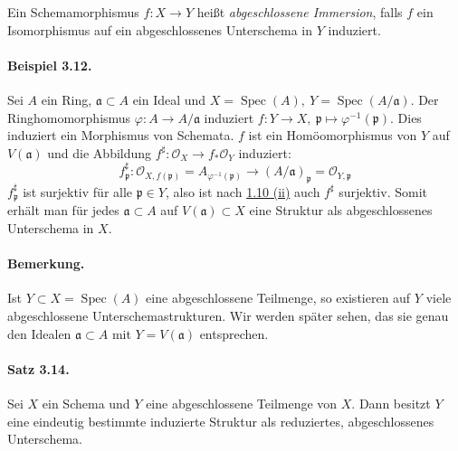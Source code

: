 \documentclass[11pt,b5paper,openany]{memoir}
\begin{document}
Ein Schemamorphismus $f:X\to Y$ heißt \textit{abgeschlossene Immersion}, falls $f$ ein Isomorphismus auf ein abgeschlossenes Unterschema in $Y$ induziert.

\paragraph{Beispiel 3.12.}\label{3.12} Sei $A$ ein Ring, $\mathfrak{a}\subset A$ ein Ideal und $X=\operatorname{Spec}(A),\ Y=\operatorname{Spec}(A/\mathfrak{a})$. Der Ringhomomorphismus $\varphi:A\to A/\mathfrak{a}$ induziert $f:Y\to X,\ \mathfrak{p}\mapsto\varphi^{-1}(\mathfrak{p})$. Dies induziert ein Morphismus von Schemata. $f$ ist ein Homöomorphismus von $Y$ auf $V(\mathfrak{a})$ und die Abbildung $f^\sharp:\mathcal{O}_X\to f_\ast\mathcal{O}_Y$ induziert: 
\[f_\mathfrak{p}^\sharp:\mathcal{O}_{X, f(\mathfrak{p})}=A_{\varphi^{-1}(\mathfrak{p})}\to (A/\mathfrak{a})_\mathfrak{p}=\mathcal{O}_{Y,\mathfrak{p}}\]
$f_\mathfrak{p}^\sharp$ ist surjektiv für alle $\mathfrak{p}\in Y$, also ist nach \hyperref[1.10]{1.10 (ii)} auch $f^\sharp$ surjektiv. Somit erhält man für jedes $\mathfrak{a}\subset A$ auf $V(\mathfrak{a})\subset X$ eine Struktur als abgeschlossenes Unterschema in $X$.

\paragraph{Bemerkung.} Ist $Y\subset X=\operatorname{Spec}(A)$ eine abgeschlossene Teilmenge, so existieren auf $Y$ viele abgeschlossene Unterschemastrukturen. Wir werden später sehen, das sie genau den Idealen $\mathfrak{a}\subset A$ mit $Y=V(\mathfrak{a})$ entsprechen.

\paragraph{Satz 3.14.}\label{3.14} Sei $X$ ein Schema und $Y$ eine abgeschlossene Teilmenge von $X$. Dann besitzt $Y$ eine eindeutig bestimmte induzierte Struktur als reduziertes, abgeschlossenes Unterschema.

\iffalse
\end{document}
